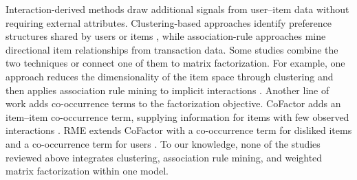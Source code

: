 \documentclass[pdflatex,sn-vancouver-num]{sn-jnl}%
\theoremstyle{thmstyleone}%
\theoremstyle{thmstyletwo}%
\theoremstyle{thmstylethree}%
\begin{document}
Interaction-derived methods draw additional signals from user--item data without requiring external attributes. Clustering-based approaches identify preference structures shared by users or items \cite{mirbakhsh2016leveraging}, while association-rule approaches mine directional item relationships from transaction data. Some studies combine the two techniques or connect one of them to matrix factorization. For example, one approach reduces the dimensionality of the item space through clustering and then applies association rule mining to implicit interactions \cite{najafabadi2017clusteringARM}. Another line of work adds co-occurrence terms to the factorization objective. CoFactor adds an item--item co-occurrence term, supplying information for items with few observed interactions \cite{liang2016cofactor}. RME extends CoFactor with a co-occurrence term for disliked items and a co-occurrence term for users \cite{tran2018rme}. To our knowledge, none of the studies reviewed above integrates clustering, association rule mining, and weighted matrix factorization within one model.
\end{document}
